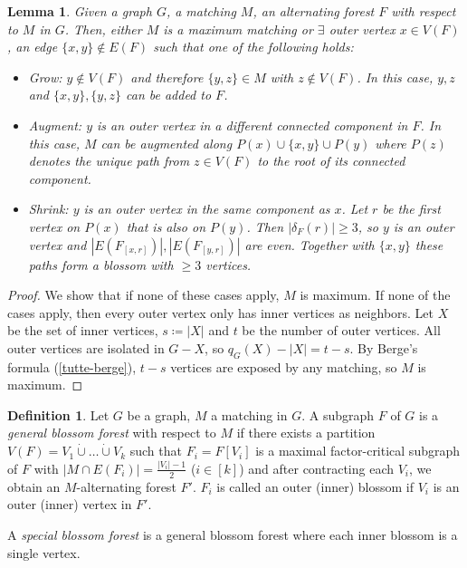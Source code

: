\documentclass[11pt, a4paper]{article}
\newcommand{\abs}[1]{\left\lvert#1\right\rvert}
\newcommand{\set}[1]{\{#1\}}
\newtheorem{lemma}[theorem]{Lemma}
\theoremstyle{remark}
\theoremstyle{definition}
\newtheorem{definition}[theorem]{Definition}
\begin{document}
\begin{lemma}
	Given a graph $G$, a matching $M$, an alternating forest $F$ with respect
	to $M$ in $G$. Then, either $M$ is a maximum matching or $\exists$
	outer vertex $x\in V(F)$, an edge $\set{x,y}\notin E(F)$ such that one
	of the following holds:
	\begin{itemize}
		\item Grow: $y\notin V(F)$ and therefore $\set{y,z}\in M$ with $z\notin
			V(F)$. In this case, $y,z$ and $\set{x,y},\set{y,z}$ can be added to
		$F$.

		\item Augment: $y$ is an outer vertex in a different connected component in
		$F$. In this case, $M$ can be augmented along $P(x)\cup\set{x,y} \cup
			P(y)$ where $P(z)$ denotes the unique path from $z\in V(F)$ to the
		root of its connected component.

		\item Shrink: $y$ is an outer vertex in the same component as $x$. Let $r$
		be the first vertex on $P(x)$ that is also on $P(y)$. Then
		$\abs{\delta_F(r)}\geq 3$, so $y$ is an outer vertex and
		$\abs{E(F_{[x,r]})},\abs{E(F_{[y,r]})}$ are even. Together with
		$\set{x,y}$ these paths form a blossom with $\geq 3$ vertices.
	\end{itemize}
\end{lemma}
\begin{proof}
	We show that if none of these cases apply, $M$ is maximum. 
	If none of the cases apply, then every outer vertex only has inner vertices as neighbors. 
	Let $X$ be
	the set of inner vertices, $s\coloneqq\abs{X}$ and $t$ be the number
	of outer vertices. All outer vertices are isolated in $G-X$, so
	$q_G(X)-\abs{X}=t-s$. By Berge's formula (\ref{tutte-berge}), $t-s$
	vertices are exposed by any matching, so $M$ is maximum.
\end{proof}

\begin{definition}\label{def:special-blossom-forest}
	Let $G$ be a graph, $M$ a matching in $G$. A subgraph $F$ of $G$ is a
	\emph{general blossom forest} with respect to $M$ if there exists a
	partition $V(F)=V_1\dot\cup\ldots\dot\cup V_k$ such that $F_i=F[V_i]$
	is a maximal factor-critical subgraph of $F$ with $\abs{M\cap E(F_i)}
		=\frac{\abs{V_i}-1}{2}$ ($i\in [k]$) and after contracting each $V_i$,
	we obtain an $M$-alternating forest $F'$.
	$F_i$ is called an outer (inner) blossom if $V_i$ is an outer (inner)
	vertex in $F'$.

	A \emph{special blossom forest} is a general blossom forest where
	each inner blossom is a single vertex.
\end{definition}
\end{document}
